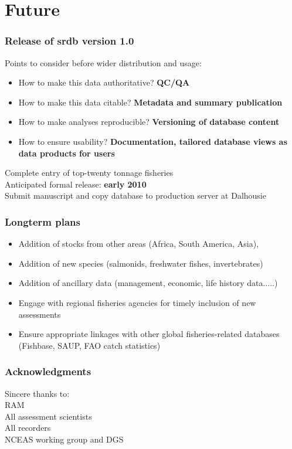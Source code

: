 \documentclass{beamer}
\begin{document}
\section{Future}

\begin{frame}
\frametitle{Release of srdb version 1.0}
Points to consider before wider distribution and usage:
\begin{itemize}
 \item How to make this data authoritative? {\bf QC/QA}
 \item How to make this data citable? {\bf Metadata and summary publication}
 \item How to make analyses reproducible? {\bf Versioning of database content}
 \item How to ensure usability? {\bf Documentation, tailored database views as data products for users}
\end{itemize}
\vspace{.25cm}
Complete entry of top-twenty tonnage fisheries\\
\vspace{.25cm}
Anticipated formal release: {\bf early 2010}\\
Submit manuscript and copy database to production server at Dalhousie
\end{frame}

\begin{frame}
\frametitle{Longterm plans}
\begin{itemize}
\item Addition of stocks from other areas (Africa, South America, Asia), 
\item Addition of new species (salmonids, freshwater fishes, invertebrates)
\item Addition of ancillary data (management, economic, life history data.....)
\item Engage with regional fisheries agencies for timely inclusion of new assessments 
\item Ensure appropriate linkages with other global fisheries-related databases (Fishbase, SAUP, FAO catch statistics) 
\end{itemize}
\end{frame}

\begin{frame}
\frametitle{Acknowledgments}
Sincere thanks to:\\
\vspace{.5cm}
RAM \\
All assessment scientists\\ 
All recorders\\
NCEAS working group and DGS
\end{frame}
\end{document}
